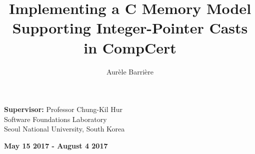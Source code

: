 \documentclass{llncs2e/llncs}
\begin{document}
%
\pagestyle{headings}  %
%
\title{Implementing a C Memory Model Supporting Integer-Pointer Casts in CompCert}
%
\author{Aur\`ele Barri\`ere}
%
%

\maketitle              %

\hrulefill

\begin{center}
  \textbf{Supervisor: } Professor Chung-Kil Hur\\
  Software Foundations Laboratory\\
  Seoul National University, South Korea
\end{center}

\hrulefill

\begin{center}
  \textbf{May 15 2017 - August 4 2017}
\end{center}
\end{document}
